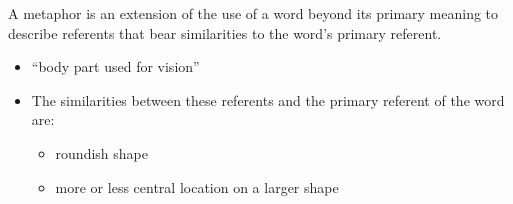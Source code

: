 \documentclass[headrule,footrule]{foils}
\begin{document}

\begin{exe}
\ex {}
\ex {}
\ex {}
\ex {}
\ex {}
\end{exe}



A metaphor is an extension of the use of a word beyond its
primary meaning to describe referents that bear similarities to
the word’s primary referent.
\begin{itemize}
\item {} ``body part used for vision''
  \begin{exe}
  \ex {}
  \ex {}
  \ex {}
  \end{exe}
\item The similarities between these referents and the primary referent of
the word  are:
\begin{itemize}
\item roundish shape
\item more or less central location on a larger shape
\end{itemize}
\end{itemize}
\end{document}
